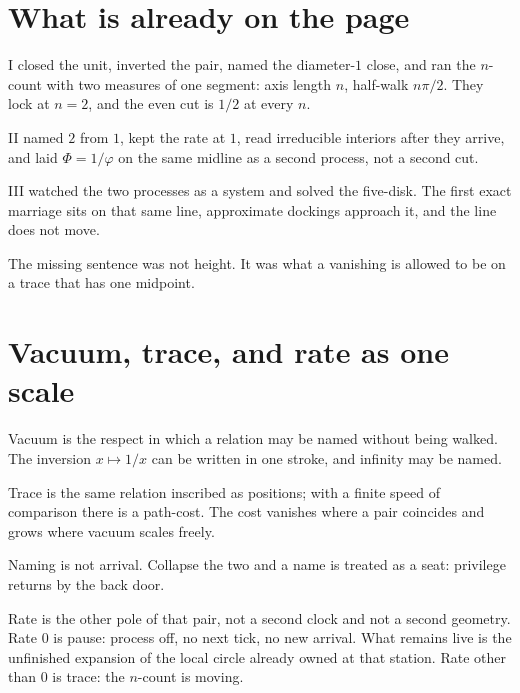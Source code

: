 \documentclass[10pt,a4paper]{article}
\theoremstyle{plain}
\theoremstyle{definition}
\theoremstyle{remark}
\begin{document}
\newpage
\tableofcontents
\newpage

\section{What is already on the page}

I closed the unit, inverted the pair, named the diameter-$1$ close, and ran the $n$-count with two measures of one segment: axis length $n$, half-walk $n\pi/2$.
They lock at $n=2$, and the even cut is $1/2$ at every $n$.

II named $2$ from $1$, kept the rate at $1$, read irreducible interiors after they arrive, and laid $\Phi=1/\varphi$ on the same midline as a second process, not a second cut.

III watched the two processes as a system and solved the five-disk.
The first exact marriage sits on that same line, approximate dockings approach it, and the line does not move.

The missing sentence was not height.
It was what a vanishing is allowed to be on a trace that has one midpoint.

\section{Vacuum, trace, and rate as one scale}

Vacuum is the respect in which a relation may be named without being walked.
The inversion $x\mapsto 1/x$ can be written in one stroke, and infinity may be named.

Trace is the same relation inscribed as positions; with a finite speed of comparison there is a path-cost.
The cost vanishes where a pair coincides and grows where vacuum scales freely.

Naming is not arrival.
Collapse the two and a name is treated as a seat: privilege returns by the back door.

Rate is the other pole of that pair, not a second clock and not a second geometry.
Rate $0$ is pause: process off, no next tick, no new arrival.
What remains live is the unfinished expansion of the local circle already owned at that station.
Rate other than $0$ is trace: the $n$-count is moving.
\end{document}
